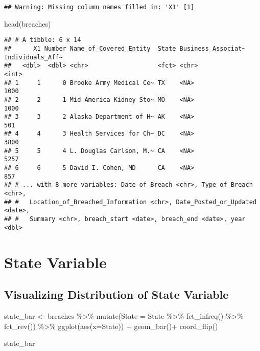 \documentclass[
]{article}
\newenvironment{Shaded}{\begin{snugshade}}{\end{snugshade}}
\newcommand{\AttributeTok}[1]{\textcolor[rgb]{0.77,0.63,0.00}{#1}}
\newcommand{\FunctionTok}[1]{\textcolor[rgb]{0.00,0.00,0.00}{#1}}
\newcommand{\NormalTok}[1]{#1}
\newcommand{\OtherTok}[1]{\textcolor[rgb]{0.56,0.35,0.01}{#1}}
\newcommand{\SpecialCharTok}[1]{\textcolor[rgb]{0.00,0.00,0.00}{#1}}
\begin{document}
\begin{verbatim}
## Warning: Missing column names filled in: 'X1' [1]
\end{verbatim}

\begin{Shaded}
\begin{Highlighting}[]
\FunctionTok{head}\NormalTok{(breaches)}
\end{Highlighting}
\end{Shaded}

\begin{verbatim}
## # A tibble: 6 x 14
##      X1 Number Name_of_Covered_Entity  State Business_Associat~ Individuals_Aff~
##   <dbl>  <dbl> <chr>                   <fct> <chr>                         <int>
## 1     1      0 Brooke Army Medical Ce~ TX    <NA>                           1000
## 2     2      1 Mid America Kidney Sto~ MO    <NA>                           1000
## 3     3      2 Alaska Department of H~ AK    <NA>                            501
## 4     4      3 Health Services for Ch~ DC    <NA>                           3800
## 5     5      4 L. Douglas Carlson, M.~ CA    <NA>                           5257
## 6     6      5 David I. Cohen, MD      CA    <NA>                            857
## # ... with 8 more variables: Date_of_Breach <chr>, Type_of_Breach <chr>,
## #   Location_of_Breached_Information <chr>, Date_Posted_or_Updated <date>,
## #   Summary <chr>, breach_start <date>, breach_end <date>, year <dbl>
\end{verbatim}

\hypertarget{state-variable}{%
\section{State Variable}\label{state-variable}}

\hypertarget{visualizing-distribution-of-state-variable}{%
\subsection{Visualizing Distribution of State
Variable}\label{visualizing-distribution-of-state-variable}}

\begin{Shaded}
\begin{Highlighting}[]
\NormalTok{state\_bar }\OtherTok{\textless{}{-}}\NormalTok{ breaches }\SpecialCharTok{\%\textgreater{}\%}
  \FunctionTok{mutate}\NormalTok{(}\AttributeTok{State =}\NormalTok{ State }\SpecialCharTok{\%\textgreater{}\%} \FunctionTok{fct\_infreq}\NormalTok{() }\SpecialCharTok{\%\textgreater{}\%} \FunctionTok{fct\_rev}\NormalTok{()) }\SpecialCharTok{\%\textgreater{}\%}
  \FunctionTok{ggplot}\NormalTok{(}\FunctionTok{aes}\NormalTok{(}\AttributeTok{x=}\NormalTok{State)) }\SpecialCharTok{+}
  \FunctionTok{geom\_bar}\NormalTok{()}\SpecialCharTok{+}
  \FunctionTok{coord\_flip}\NormalTok{()}

\NormalTok{state\_bar}
\end{Highlighting}
\end{Shaded}
\end{document}
